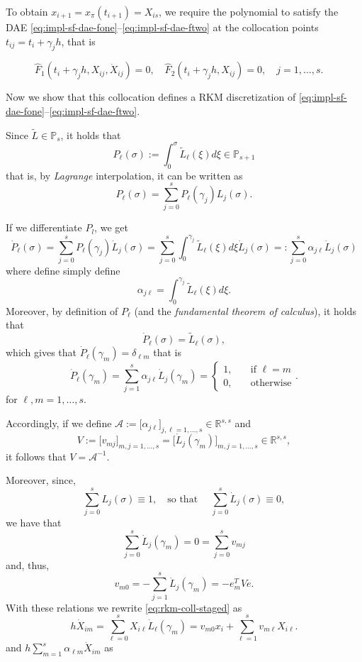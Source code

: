 \documentclass[]{book}
\theoremstyle{definition}
\theoremstyle{definition}
\theoremstyle{definition}
\theoremstyle{remark}
\begin{document}
To obtain \(x_{i+1}=x_\pi(t_{i+1})=X_{is}\), we require the polynomial
to satisfy the DAE \eqref{eq:impl-sf-dae-fone}--\eqref{eq:impl-sf-dae-ftwo}
at the collocation points \(t_{ij}=t_i+\gamma_jh\), that is

\begin{equation}
\hat F_1(t_i+\gamma_jh,X_{ij},\dot X_{ij}) = 0, \quad \hat F_2(t_i+\gamma_jh,X_{ij}) = 0, \quad j=1,\dotsc,s. \phantom{F_1} \label{eq:impl-sf-dae-collo}
\end{equation}

Now we show that this collocation defines a RKM discretization of
\eqref{eq:impl-sf-dae-fone}--\eqref{eq:impl-sf-dae-ftwo}.

Since \(\tilde L \in \mathbb P_s\), it holds that \[
P_\ell(\sigma):=\int_0^\sigma \tilde L_\ell (\xi)d\xi \in \mathbb P_{s+1}
\] that is, by \emph{Lagrange} interpolation, it can be written as \[
P_\ell(\sigma) = \sum_{j=0}^s P_\ell(\gamma_j)L_j(\sigma).
\]

If we differentiate \(P_l\), we get \[
\dot P_\ell(\sigma) = \sum_{j=0}^s P_\ell(\gamma_j)\dot L_j(\sigma) = \sum_{j=0}^s \int_0^{\gamma_j} \tilde L_\ell (\xi)d\xi \dot L_j(\sigma)=: \sum_{j=0}^s \alpha_{j\ell} \dot L_j(\sigma)
\] where define simply define \[
\alpha_{j\ell} = \int_0^{\gamma_j} \tilde L_\ell (\xi)d\xi.
\] Moreover, by definition of \(P_\ell\) (and the \emph{fundamental
theorem of calculus}), it holds that \[
\dot P_\ell(\sigma) = \tilde L_\ell(\sigma),
\] which gives that \(\dot P_\ell(\gamma_m) = \delta_{\ell m}\) that is
\[
\dot P_\ell(\gamma_m) = \sum_{j=1}^s\alpha_{j\ell}\dot L_j(\gamma_m) = 
\begin{cases}
1, &\quad \text{if }\ell =m \\
0, &\quad \text{otherwise} 
\end{cases}.
\] for \(\ell, m=1,\dotsc,s\).

Accordingly, if we define
\(\mathcal A := \bigl[\alpha_{j\ell}\bigr]_{j,\ell=1,\dotsc,s} \in \mathbb R^{s,s}\)
and \[
V:=\bigl[v_{mj}\bigr]_{m,j=1,\dotsc,s} = \bigl[ \dot L_j(\gamma_m) \bigr]_{m,j=1,\dotsc,s} \in \mathbb R^{s,s} ,
\] it follows that \(V=\mathcal A^{-1}\).

Moreover, since, \[
\sum_{j=0}^s L_j(\sigma) \equiv 1, \quad\text{so that }\quad\sum_{j=0}^s \dot L_j(\sigma) \equiv 0,
\] we have that \[
\sum_{j=0}^s \dot L_j(\gamma_m) =0= \sum_{j=0}^s v_{mj}
\] and, thus, \[
v_{m0} = -\sum_{j=1}^s \dot L_j(\gamma_m) = -e_m^TVe.
\] With these relations we rewrite \eqref{eq:rkm-coll-staged} as \[
h\dot X_{im} = \sum_{\ell=0}^sX_{i\ell}\dot L_\ell(\gamma_m) = v_{m0}x_i + \sum_{\ell=1}^sv_{m\ell}X_{i\ell}.
\] and \(h\sum_{m=1}^s\alpha_{\ell m} \dot X_{im}\) as
\end{document}
